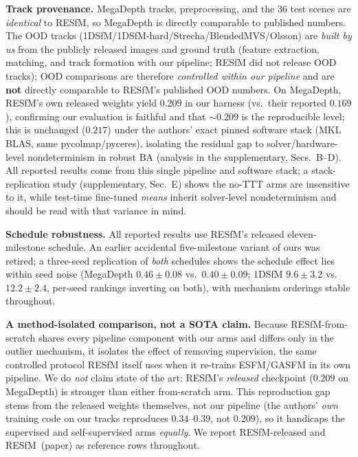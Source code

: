 \documentclass[10pt,twocolumn,letterpaper]{article}
\begin{document}
\noindent\textbf{Track provenance.} MegaDepth tracks, preprocessing, and the 36 test scenes
are \emph{identical} to RESfM, so MegaDepth is directly comparable to published numbers. The
OOD tracks (1DSfM/1DSfM-hard/Strecha/BlendedMVS/Olsson) are \emph{built by us} from the
publicly released images and ground truth (feature extraction, matching, and track
formation with our pipeline; RESfM did not release OOD tracks); OOD comparisons are therefore \emph{controlled within our pipeline} and are
\textbf{not} directly comparable to RESfM's published OOD numbers. On MegaDepth, RESfM's
own released weights yield $0.209$ in our harness (vs.\ their reported $0.169$),
confirming our evaluation is faithful and that $\sim\!0.209$ is the reproducible level;
this is unchanged ($0.217$) under the authors' exact pinned software stack (MKL BLAS,
same pycolmap/pyceres), isolating the residual gap to solver/hardware-level
nondeterminism in robust BA (analysis in the supplementary, Secs.~B--D). All reported results come from this
single pipeline and software stack; a stack-replication study (supplementary, Sec.~E) shows the
no-TTT arms are insensitive to it, while test-time fine-tuned \emph{means} inherit
solver-level nondeterminism and should be read with that variance in mind.

\noindent\textbf{Schedule robustness.} All reported results use RESfM's released
eleven-milestone schedule. An earlier accidental five-milestone variant of ours was
retired; a three-seed replication of \emph{both} schedules shows the schedule effect lies
within seed noise (MegaDepth $0.46\pm0.08$ vs.\ $0.40\pm0.09$; 1DSfM $9.6\pm3.2$ vs.\
$12.2\pm2.4$, per-seed rankings inverting on both), with mechanism orderings stable
throughout.

\noindent\textbf{A method-isolated comparison, not a SOTA claim.} Because
RESfM-from-scratch shares every pipeline component with our arms and differs only in the
outlier mechanism, it isolates the effect of removing supervision, the same controlled
protocol RESfM itself uses when it re-trains ESFM/GASFM in its own pipeline. We do
\emph{not} claim state of the art: RESfM's \emph{released} checkpoint ($0.209$ on
MegaDepth) is stronger than either from-scratch arm. This reproduction gap stems from the
released weights themselves, not our pipeline (the authors' \emph{own} training code on
our tracks reproduces $0.34$--$0.39$, not $0.209$), so it handicaps the
supervised and self-supervised arms \emph{equally}. We report RESfM-released and
RESfM~(paper) as reference rows throughout.
\end{document}
